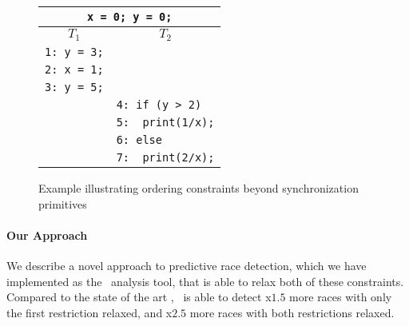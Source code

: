 \begin{figure}
\centering
\begin{tabular}{ll}
\multicolumn{2}{c}{{\tt x = 0; y = 0;}} \\  %
\hline
\multicolumn{1}{c}{$T_1$} & \multicolumn{1}{c}{$T_2$} \\
\hline
{\tt 1: y = 3;} & \\
{\tt 2: x = 1;} & \\
{\tt 3: y = 5;} & \\
& {\tt 4: if (y > 2)} \\
& {\tt 5:~~print(1/x);} \\	
& {\color{red} {\tt 6: else}} \\
& {\color{red} {\tt 7:~~print(2/x);}}
\end{tabular}
\caption{Example illustrating ordering constraints beyond synchronization primitives}
\label{fig:running}
\end{figure}

%
 
 \paragraph{Our Approach} We describe a novel approach to predictive race detection, which we have implemented as the \tool\ analysis tool, that is able to relax both of these constraints. Compared to the state of the art \cite{pldi14}, \tool\ is able to detect x$1.5$ more races with only the first restriction relaxed, and x$2.5$ more races with both restrictions relaxed. 
 
